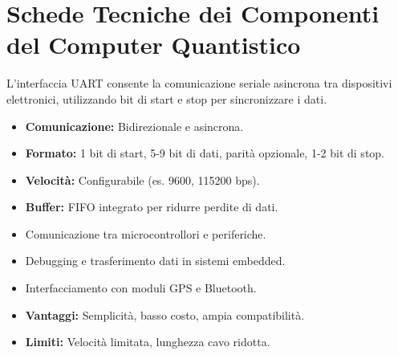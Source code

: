 \section*{Schede Tecniche dei Componenti del Computer Quantistico}


\begin{tcolorbox}[fontupper=\small, colback=white, colframe=black, title=\textbf{Interfaccia UART (Universal Asynchronous Receiver-Transmitter)}]
L'interfaccia UART consente la comunicazione seriale asincrona tra dispositivi elettronici, utilizzando bit di start e stop per sincronizzare i dati.
\end{tcolorbox}

\begin{tcolorbox}[fontupper=\small, colback=white, colframe=black, title=\textbf{Caratteristiche}]
\begin{itemize}
    \item \textbf{Comunicazione:} Bidirezionale e asincrona.
    \item \textbf{Formato:} 1 bit di start, 5-9 bit di dati, parità opzionale, 1-2 bit di stop.
    \item \textbf{Velocità:} Configurabile (es. 9600, 115200 bps).
    \item \textbf{Buffer:} FIFO integrato per ridurre perdite di dati.
\end{itemize}
\end{tcolorbox}

\begin{tcolorbox}[fontupper=\small, colback=white, colframe=black, title=\textbf{Applicazioni}]
\begin{itemize}
    \item Comunicazione tra microcontrollori e periferiche.
    \item Debugging e trasferimento dati in sistemi embedded.
    \item Interfacciamento con moduli GPS e Bluetooth.
\end{itemize}
\end{tcolorbox}

\begin{tcolorbox}[fontupper=\small, colback=white, colframe=black, title=\textbf{Vantaggi e Limiti}]
\begin{itemize}
    \item \textbf{Vantaggi:} Semplicità, basso costo, ampia compatibilità.
    \item \textbf{Limiti:} Velocità limitata, lunghezza cavo ridotta.
\end{itemize}
\end{tcolorbox}

